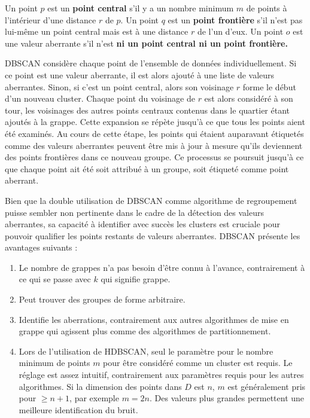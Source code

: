 Un point $p$ est un \textbf{point central} s'il y a un nombre minimum $m$ de points à l'intérieur d'une distance $r$ de $p$.
Un point $q$ est un \textbf{point frontière} s'il n'est pas lui-même un point central mais est à une distance $r$ de l'un d'eux.
Un point $o$ est une valeur aberrante s'il n'est \textbf{ni un point central ni un point frontière.}

DBSCAN considère chaque point de l'ensemble de données individuellement.
Si ce point est une valeur aberrante, il est alors ajouté à une liste de valeurs aberrantes.
Sinon, si c'est un point central, alors son voisinage $r$ forme le début d'un nouveau cluster.
Chaque point du voisinage de $r$ est alors considéré à son tour, les  voisinages  des autres points centraux contenus dans le quartier étant ajoutés à la grappe.
Cette expansion se répète jusqu'à ce que tous les points aient été examinés.
Au cours de cette étape, les points qui étaient auparavant étiquetés comme des valeurs aberrantes peuvent être mis à jour à mesure qu'ils deviennent des points frontières dans ce nouveau groupe.
Ce processus se poursuit jusqu'à ce que chaque point ait été soit attribué à un groupe, soit étiqueté comme point aberrant.

Bien que la double utilisation de DBSCAN comme algorithme de regroupement puisse sembler non pertinente dans le cadre de la détection des valeurs aberrantes,
sa capacité à identifier avec succès les clusters est cruciale pour pouvoir qualifier les points restants de valeurs aberrantes.
DBSCAN présente les avantages suivants :
\begin{enumerate}
\item Le nombre de grappes n'a pas besoin d'être connu à l'avance, contrairement à ce qui se passe avec $k$ qui signifie grappe.
\item  Peut trouver des groupes de forme arbitraire.
\item Identifie les aberrations, contrairement aux autres algorithmes de mise en grappe qui agissent plus comme des algorithmes de partitionnement.
\item Lors de l'utilisation de HDBSCAN, seul le paramètre pour le nombre minimum de points $m$ pour être considéré comme un cluster est requis.
Le réglage est assez intuitif, contrairement aux paramètres requis pour les autres algorithmes.
Si la dimension des points dans $D$ est $n$, $m$ est généralement pris pour $\geq n + 1$, par exemple $m = 2n$.
Des valeurs plus grandes permettent une meilleure identification du bruit.
\end{enumerate}

